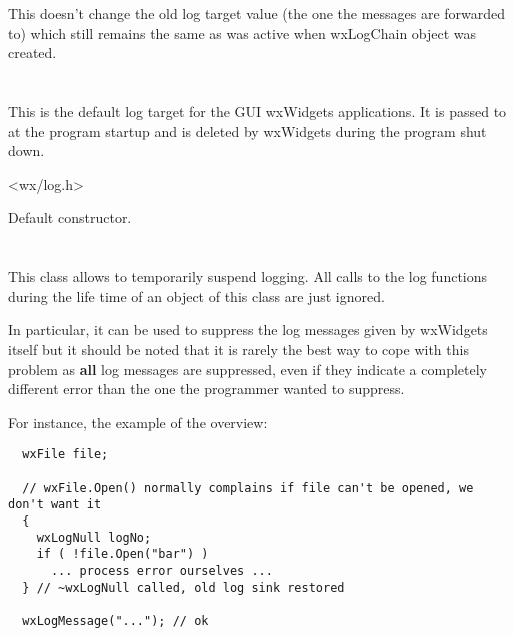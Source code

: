 This doesn't change the old log target value (the one the messages are
forwarded to) which still remains the same as was active when wxLogChain
object was created.


\section{}\label{wxloggui}

This is the default log target for the GUI wxWidgets applications. It is passed
to  at the program
startup and is deleted by wxWidgets during the program shut down.




<wx/log.h>




Default constructor.


\section{}\label{wxlognull}

This class allows to temporarily suspend logging. All calls to the log
functions during the life time of an object of this class are just ignored.

In particular, it can be used to suppress the log messages given by wxWidgets
itself but it should be noted that it is rarely the best way to cope with this
problem as {\bf all} log messages are suppressed, even if they indicate a
completely different error than the one the programmer wanted to suppress.

For instance, the example of the overview:

{\small
\begin{verbatim}
  wxFile file;

  // wxFile.Open() normally complains if file can't be opened, we don't want it
  {
    wxLogNull logNo;
    if ( !file.Open("bar") )
      ... process error ourselves ...
  } // ~wxLogNull called, old log sink restored

  wxLogMessage("..."); // ok
\end{verbatim}
}


